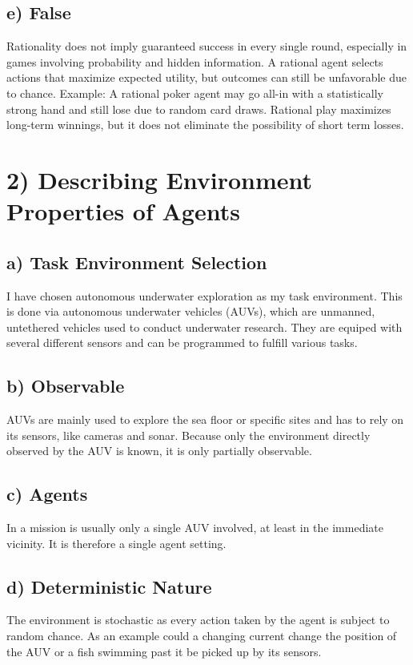 \documentclass[12pt]{scrartcl}
\begin{document}
    \subsection*{e) False}
    Rationality does not imply guaranteed success in every single round, especially in games involving probability and hidden information. A rational agent selects actions that maximize expected utility, but outcomes can
    still be unfavorable due to chance.
    Example: A rational poker agent may go all-in with a statistically strong hand and still lose due to random card draws. Rational play maximizes long-term winnings, but it does not eliminate the possibility of short
    term losses.

\section*{2) Describing Environment Properties of Agents}
    \subsection*{a) Task Environment Selection}
        I have chosen autonomous underwater exploration as my task environment. 
        This is done via autonomous underwater vehicles (AUVs), 
        which are unmanned, untethered vehicles used to conduct underwater research.
        They are equiped with several different sensors and can be programmed to fulfill various tasks.

    \subsection*{b) Observable}
        AUVs are mainly used to explore the sea floor or specific sites and has to rely on its sensors, like cameras and sonar.
        Because only the environment directly observed by the AUV is known, it is only partially observable.
    
        \subsection*{c) Agents}
        In a mission is usually only a single AUV involved, at least in the immediate vicinity. It is therefore a single agent setting.
        
    \subsection*{d) Deterministic Nature}
        The environment is stochastic as every action taken by the agent is subject to random chance. 
        As an example could a changing current change the position of the AUV or a fish swimming past it be picked up by its sensors.
    
\end{document}
